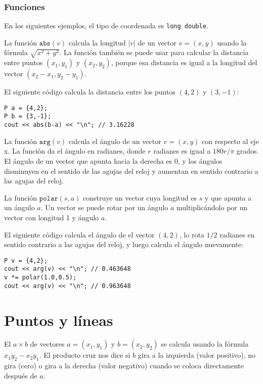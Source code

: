 \subsubsection*{Funciones}

En los siguientes ejemplos, el tipo de coordenada es
\texttt{long double}.

La función $\texttt{abs}(v)$ calcula la longitud
$|v|$ de un vector $v=(x,y)$
usando la fórmula $\sqrt{x^2+y^2}$.
La función también se puede usar para
calcular la distancia entre puntos
$(x_1,y_1)$ y $(x_2,y_2)$,
porque esa distancia es igual a la longitud
del vector $(x_2-x_1,y_2-y_1)$.

El siguiente código calcula la distancia
entre los puntos $(4,2)$ y $(3,-1)$:
\begin{lstlisting}
P a = {4,2};
P b = {3,-1};
cout << abs(b-a) << "\n"; // 3.16228
\end{lstlisting}

La función $\texttt{arg}(v)$ calcula el
ángulo de un vector $v=(x,y)$ con respecto al eje x.
La función da el ángulo en radianes,
donde $r$ radianes es igual a $180 r/\pi$ grados.
El ángulo de un vector que apunta hacia la derecha es 0,
y los ángulos disminuyen en el sentido de las agujas del reloj y aumentan
en sentido contrario a las agujas del reloj.

La función $\texttt{polar}(s,a)$ construye un vector
cuya longitud es $s$ y que apunta a un ángulo $a$.
Un vector se puede rotar por un ángulo $a$
multiplicándolo por un vector con longitud 1 y ángulo $a$.

El siguiente código calcula el ángulo de
el vector $(4,2)$, lo rota $1/2$ radianes
en sentido contrario a las agujas del reloj, y luego calcula el ángulo nuevamente:

\begin{lstlisting}
P v = {4,2};
cout << arg(v) << "\n"; // 0.463648
v *= polar(1.0,0.5);
cout << arg(v) << "\n"; // 0.963648
\end{lstlisting}

\section{Puntos y líneas}


El  $a \times b$ de vectores
$a=(x_1,y_1)$ y $b=(x_2,y_2)$ se calcula
usando la fórmula $x_1 y_2 - x_2 y_1$.
El producto cruz nos dice si $b$
gira a la izquierda (valor positivo), no gira (cero)
o gira a la derecha (valor negativo)
cuando se coloca directamente después de $a$.


